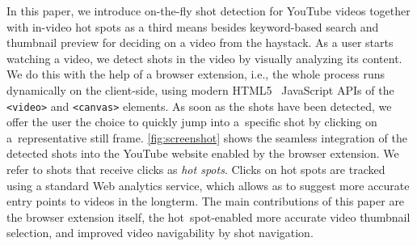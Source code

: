 \documentclass{acm_proc_article-sp}
\begin{document}

In this paper, we introduce on-the-fly shot detection for YouTube videos together with in-video hot spots as a third means besides keyword-based search and thumbnail preview for deciding on a video from the haystack. As a user starts watching a video, we detect shots in the video by visually analyzing its content. We do this with the help of a browser extension, i.e., the whole process runs dynamically on the client-side, using modern HTML5~\cite{w3c_html5} JavaScript APIs of the \texttt{<video>} and \texttt{<canvas>} elements. As soon as the shots have been detected, we offer the user the choice to quickly jump into a~specific shot by clicking on a~representative still frame. \autoref{fig:screenshot} shows the seamless integration of the detected shots into the YouTube website enabled by the browser extension. We refer to shots that receive clicks as \emph{hot spots}. Clicks on hot spots are tracked using a standard Web analytics service, which allows as to suggest more accurate entry points to videos in the longterm. The main contributions of this paper are the browser extension itself, the hot~spot-enabled more accurate video thumbnail selection, and improved video navigability by shot navigation.

\end{document}
